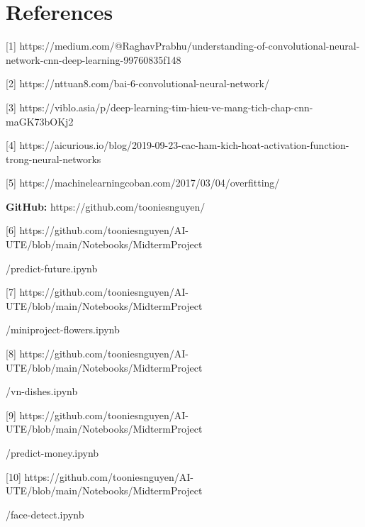\documentclass[12pt, a4paper]{article}
\begin{document}
\newpage
\section{References}
\par \hspace{1cm} [1] https://medium.com/@RaghavPrabhu/understanding-of-convolutional-neural-network-cnn-deep-learning-99760835f148
\par \hspace{1cm} [2] https://nttuan8.com/bai-6-convolutional-neural-network/
\par \hspace{1cm} [3] https://viblo.asia/p/deep-learning-tim-hieu-ve-mang-tich-chap-cnn-maGK73bOKj2
\par \hspace{1cm} [4] https://aicurious.io/blog/2019-09-23-cac-ham-kich-hoat-activation-function-trong-neural-networks
\par \hspace{1cm} [5] https://machinelearningcoban.com/2017/03/04/overfitting/
\vspace{0.5cm}
\par \textbf{GitHub: }https://github.com/tooniesnguyen/
\par \hspace{1cm} [6] https://github.com/tooniesnguyen/AI-UTE/blob/main/Notebooks/MidtermProject
\par \hspace{0cm}/predict-future.ipynb

\par \hspace{1cm} [7] https://github.com/tooniesnguyen/AI-UTE/blob/main/Notebooks/MidtermProject
\par /miniproject-flowers.ipynb
\par \hspace{1cm} [8] https://github.com/tooniesnguyen/AI-UTE/blob/main/Notebooks/MidtermProject
\par /vn-dishes.ipynb
\par \hspace{1cm} [9] https://github.com/tooniesnguyen/AI-UTE/blob/main/Notebooks/MidtermProject
\par /predict-money.ipynb
\par \hspace{1cm} [10] https://github.com/tooniesnguyen/AI-UTE/blob/main/Notebooks/MidtermProject
\par /face-detect.ipynb
\vspace{0.5cm}
\end{document}

